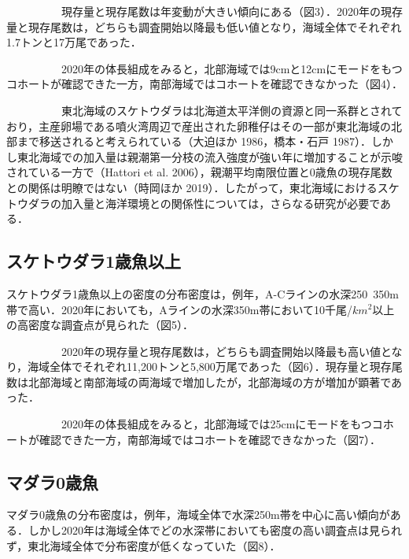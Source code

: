 \documentclass[11pt]{article} %
\begin{document}
\begin{linenumbers}
\ \ \ \ \ \ \ \ \ \ 
現存量と現存尾数は年変動が大きい傾向にある（図3）．2020年の現存量と現存尾数は，どちらも調査開始以降最も低い値となり，海域全体でそれぞれ1.7トンと17万尾であった．

\ \ \ \ \ \ \ \ \ \ 
2020年の体長組成をみると，北部海域では9cmと12cmにモードをもつコホートが確認できた一方，南部海域ではコホートを確認できなかった（図4）．

\ \ \ \ \ \ \ \ \ \ 
東北海域のスケトウダラは北海道太平洋側の資源と同一系群とされており，主産卵場である噴火湾周辺で産出された卵稚仔はその一部が東北海域の北部まで移送されると考えられている（大迫ほか 1986，橋本・石戸 1987）．しかし東北海域での加入量は親潮第一分枝の流入強度が強い年に増加することが示唆されている一方で（Hattori et al. 2006），親潮平均南限位置と0歳魚の現存尾数との関係は明瞭ではない（時岡ほか 2019）．したがって，東北海域におけるスケトウダラの加入量と海洋環境との関係性については，さらなる研究が必要である．

\subsection{スケトウダラ1歳魚以上}
スケトウダラ1歳魚以上の密度の分布密度は，例年，A-Cラインの水深250~350m帯で高い．2020年においても，Aラインの水深350m帯において10千尾/$km^2$以上の高密度な調査点が見られた（図5）．

\ \ \ \ \ \ \ \ \ \ 
2020年の現存量と現存尾数は，どちらも調査開始以降最も高い値となり，海域全体でそれぞれ11,200トンと5,800万尾であった（図6）．現存量と現存尾数は北部海域と南部海域の両海域で増加したが，北部海域の方が増加が顕著であった．

\ \ \ \ \ \ \ \ \ \ 
2020年の体長組成をみると，北部海域では25cmにモードをもつコホートが確認できた一方，南部海域ではコホートを確認できなかった（図7）．


\subsection{マダラ0歳魚}
マダラ0歳魚の分布密度は，例年，海域全体で水深250m帯を中心に高い傾向がある．しかし2020年は海域全体でどの水深帯においても密度の高い調査点は見られず，東北海域全体で分布密度が低くなっていた（図8）．


\end{linenumbers}
\end{document}

